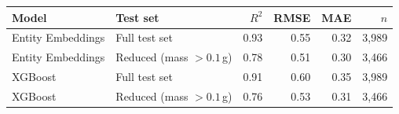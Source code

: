 \begin{tabular}{llrrrr}
\toprule
Model & Test set & $R^2$ & RMSE & MAE & $n$ \\
\midrule
Entity Embeddings & Full test set & 0.93 & 0.55 & 0.32 & 3{,}989 \\
Entity Embeddings & Reduced (mass $>0.1$\,g) & 0.78 & 0.51 & 0.30 & 3{,}466 \\
XGBoost & Full test set & 0.91 & 0.60 & 0.35 & 3{,}989 \\
XGBoost & Reduced (mass $>0.1$\,g) & 0.76 & 0.53 & 0.31 & 3{,}466 \\
\bottomrule
\end{tabular}
